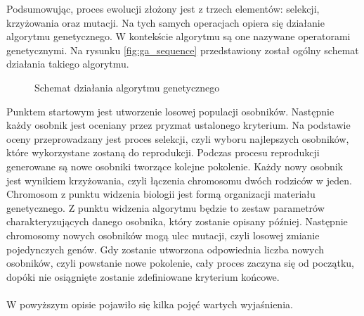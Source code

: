 \documentclass[twoside]{iisthesis}
\begin{document}
Podsumowując, proces ewolucji złożony jest z trzech elementów: selekcji, krzyżowania oraz mutacji. Na tych samych operacjach opiera się działanie algorytmu genetycznego. W kontekście algorytmu są one nazywane operatorami genetycznymi. Na rysunku \eqref{fig:ga_sequence} przedstawiony został ogólny schemat działania takiego algorytmu.
\begin{figure}[!htb]
	\centering
	\caption{Schemat działania algorytmu genetycznego}
	\label{fig:ga_sequence}
\end{figure}

Punktem startowym jest utworzenie losowej populacji osobników. Następnie każdy osobnik jest oceniany przez pryzmat ustalonego kryterium. Na podstawie oceny przeprowadzany jest proces selekcji, czyli wyboru najlepszych osobników, które wykorzystane zostaną do reprodukcji. Podczas procesu reprodukcji generowane są nowe osobniki tworzące kolejne pokolenie. Każdy nowy osobnik jest wynikiem krzyżowania, czyli łączenia chromosomu dwóch rodziców w jeden. Chromosom z punktu widzenia biologii jest formą organizacji materiału genetycznego. Z punktu widzenia algorytmu będzie to zestaw parametrów charakteryzujących danego osobnika, który zostanie opisany później. Następnie chromosomy nowych osobników mogą ulec mutacji, czyli losowej zmianie pojedynczych genów. Gdy zostanie utworzona odpowiednia liczba nowych osobników, czyli powstanie nowe pokolenie, cały proces zaczyna się od początku, dopóki nie osiągnięte zostanie zdefiniowane kryterium końcowe.\\\\
W powyższym opisie pojawiło się kilka pojęć wartych wyjaśnienia.
\end{document}
